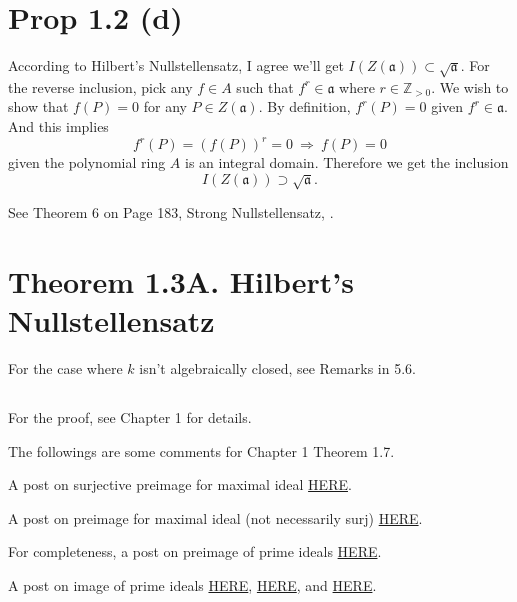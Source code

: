 \section{Prop 1.2 (d)}

According to Hilbert's Nullstellensatz, I agree we'll get $I(Z(\mathfrak a))\subset \sqrt{\mathfrak a}$.
For the reverse inclusion, pick any $f\in A$ such that $f^r\in\mathfrak a$ where $r\in\mathbb Z_{>0}$. We wish to show that $f(P)=0$ for any $P\in Z(\mathfrak a)$. By definition, $f^r(P)=0$ given $f^r\in\mathfrak a$. And this implies $$f^r(P)=(f(P))^r=0 ~\Rightarrow~ f(P)=0$$ given the polynomial ring $A$ is an integral domain. Therefore we get the inclusion 
$$I(Z(\mathfrak a))\supset \sqrt{\mathfrak a}.$$

See Theorem 6 on Page 183, Strong Nullstellensatz, \cite{cox2013ideals}. 

\section{Theorem 1.3A. Hilbert's Nullstellensatz}

For the case where $k$ isn't algebraically closed, see \cite{reid1995undergraduate} Remarks in 5.6.

\subsection{}

For the proof, see \cite{kemper2011course} Chapter 1 for details.

The followings are some comments for \cite{kemper2011course} Chapter 1 Theorem 1.7.

A post on surjective preimage for maximal ideal \href{https://math.stackexchange.com/questions/1198414/pull-back-image-of-maximal-ideal-under-surjective-ring-homomorphism-is-maximal}{HERE}.

A post on preimage for maximal ideal (not necessarily surj) \href{https://math.stackexchange.com/questions/882524/in-an-extension-of-finitely-generated-k-algebras-the-contraction-of-a-maximal}{HERE}.

For completeness, a post on preimage of prime ideals \href{https://math.stackexchange.com/questions/409999/prove-that-the-preimage-of-a-prime-ideal-is-also-prime}{HERE}.

A post on image of prime ideals \href{https://math.stackexchange.com/questions/1805457/how-to-prove-that-the-image-of-a-prime-ideal-is-also-a-prime-ideal}{HERE}, \href{https://math.stackexchange.com/questions/292829/a-proof-that-shows-surjective-homomorphic-image-of-prime-ideal-is-prime}{HERE}, and \href{https://math.stackexchange.com/questions/1144695/assume-p-is-a-prime-ideal-s-t-k-subset-p-show-fp-is-a-prime-ideal}{HERE}.

